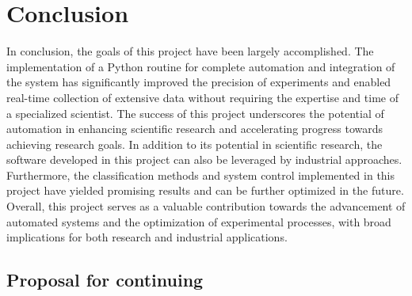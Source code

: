 \chapter{Conclusion}

In conclusion, the goals of this project have been largely accomplished. The implementation of a Python routine for complete automation and integration of the system has significantly improved the precision of experiments and enabled real-time collection of extensive data without requiring the expertise and time of a specialized scientist. The success of this project underscores the potential of automation in enhancing scientific research and accelerating progress towards achieving research goals.
In addition to its potential in scientific research, the software developed in this project can also be leveraged by industrial approaches. Furthermore, the classification methods and system control implemented in this project have yielded promising results and can be further optimized in the future. Overall, this project serves as a valuable contribution towards the advancement of automated systems and the optimization of experimental processes, with broad implications for both research and industrial applications.

\section{Proposal for continuing}


\clearpage
